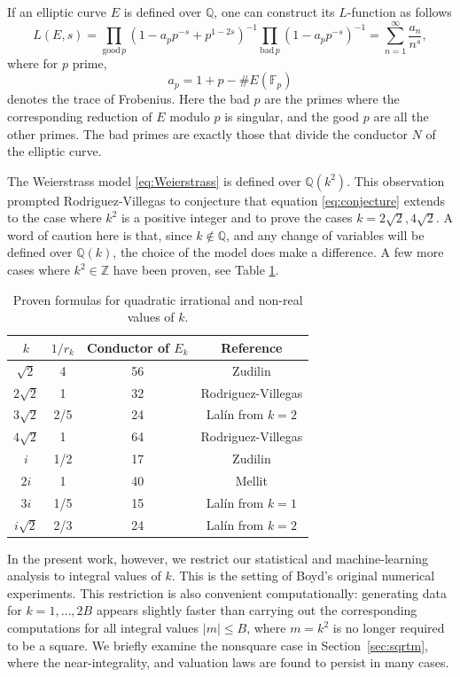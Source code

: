 \documentclass[12pt]{amsart}%
\newcommand{\1}{\mathds{1}}
\newcommand{\F}{\mathbb{F}}
\newcommand{\Q}{\mathbb{Q}}
\newcommand{\Z}{\mathbb{Z}}
\theoremstyle{definition}
\numberwithin{equation}{section}
\numberwithin{table}{section}
\numberwithin{figure}{section}
\begin{document}
If an elliptic curve $E$ is defined over $\Q$, one can construct its $L$-function as follows
\[L(E,s) = \prod_{\mathrm{good}\, p} (1-a_p p^{-s}+p^{1-2s})^{-1} \prod_{\mathrm{bad}\, p} (1-a_p p^{-s})^{-1}=\sum_{n=1}^\infty \frac{a_n}{n^s},\]
where for $p$ prime,
\[a_p = 1+p-\#E(\F_p)\]
denotes the trace of Frobenius.
Here the bad $p$ are the primes where the corresponding reduction of $E$ modulo $p$ is singular, and the good $p$ are all the other primes. The bad primes are exactly those that divide the conductor $N$ of the elliptic curve.

The Weierstrass model \eqref{eq:Weierstrass} is defined over $\Q(k^2)$. This observation prompted Rodriguez-Villegas \cite{RV} to conjecture that equation \eqref{eq:conjecture} extends to the case where $k^2$ is a positive integer and to prove the cases $k=2\sqrt{2}, 4\sqrt{2}$. A word of caution here is that, since $k \not \in \Q$, and any change of variables will be defined over $\Q(k)$, the choice of the model does make a difference. A few more cases where $k^2\in \Z$ have been proven, see Table \ref{table:proven_nonrational}.
\begin{table}[h]
\centering
\begin{tabular}{cccc}
\hline
$k$ & $1/r_k$ & Conductor of $E_k$ & Reference \\
\hline
$\sqrt{2}$     & 4  & 56  & Zudilin \cite{Zu14} \\
$2\sqrt{2}$   & 1    & 32  & Rodriguez-Villegas \cite{RV} \\
$3\sqrt{2}$   & 2/5    & 24  & Lal\'in \cite{La10} from $k=2$  \\
$4\sqrt{2}$    & 1    & 64  & Rodriguez-Villegas \cite{RV} \\
$i$            & 1/2  & 17  & Zudilin \cite{Zu14} \\
$2i$           & 1    & 40  & Mellit \cite{Mellit-Oberwolfach} \\
$3i$           & 1/5    & 15  &  Lal\'in \cite{La10} from $k=1$ \\
$i\sqrt{2}$   & 2/3    & 24  & Lal\'in \cite{La10} from $k=2$  \\
\hline
\end{tabular}
\caption{Proven formulas for quadratic irrational and non-real values of $k$.}
\label{table:proven_nonrational}
\end{table}

In the present work, however, we restrict our statistical and  machine-learning analysis to integral values of $k$. This is the setting of Boyd's original numerical experiments.
This restriction is also convenient computationally: generating data for $k=1,\ldots,2B$ appears slightly faster than carrying out the corresponding computations for all integral values $|m| \leq B$, where $m=k^2$ is no longer required to be a square. We briefly examine the nonsquare case in Section~\ref{sec:sqrtm}, where the near-integrality, and valuation laws are found to persist in many cases.
\end{document}
